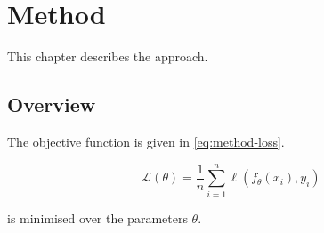 \chapter{Method}
\label{ch:method}

This chapter describes the approach.

\section{Overview}
\label{sec:method-overview}

The objective function is given in \cref{eq:method-loss}.

\begin{equation}
  \label{eq:method-loss}
  \mathcal{L}(\theta) = \frac{1}{n} \sum_{i=1}^{n} \ell(f_\theta(x_i), y_i)
\end{equation}

 is minimised over the parameters $\theta$.
